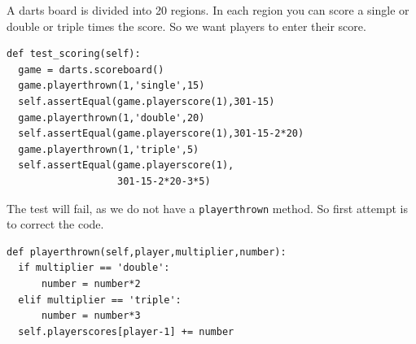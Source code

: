 \documentclass{beamer}
\begin{document}
\begin{frame}[fragile]
A darts board is divided into 20 regions. In each region you can score
a single or double or triple times the score. So we want players to
enter their score.
\begin{lstlisting}
def test_scoring(self):
  game = darts.scoreboard()
  game.playerthrown(1,'single',15)
  self.assertEqual(game.playerscore(1),301-15)
  game.playerthrown(1,'double',20)
  self.assertEqual(game.playerscore(1),301-15-2*20)
  game.playerthrown(1,'triple',5)
  self.assertEqual(game.playerscore(1),
                   301-15-2*20-3*5)
\end{lstlisting}
  
\end{frame}
\begin{frame}[fragile]
The test will fail, as we do not have a {\tt playerthrown} method. So
first attempt is to correct the code.
\begin{lstlisting}
def playerthrown(self,player,multiplier,number):
  if multiplier == 'double':
      number = number*2
  elif multiplier == 'triple':
      number = number*3
  self.playerscores[player-1] += number
\end{lstlisting}
\end{frame}
\end{document}
